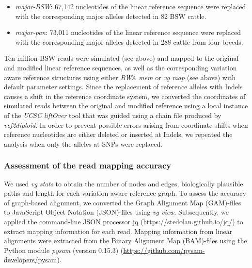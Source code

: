 \documentclass[../main.tex]{subfiles}
\begin{document}
\begin{itemize}
    \item \emph{major-BSW}: 67,142 nucleotides of the linear reference sequence were replaced with the corresponding major alleles detected in 82 BSW cattle.
    \item \emph{major-pan}: 73,011 nucleotides of the linear reference sequence were replaced with the corresponding major alleles detected in 288 cattle from four breeds.
\end{itemize}

Ten million BSW reads were simulated (see above) and mapped to the original and modified linear reference sequences, as well as the corresponding variation aware reference structures using either \emph{BWA mem} or \emph{vg map} (see above) with default parameter settings. Since the replacement of reference alleles with Indels causes a shift in the reference coordinate system, we converted the coordinates of simulated reads between the original and modified reference using a local instance of the \emph{UCSC liftOver} tool \citep{haeussler2019ucsc} that was guided using a chain file produced by \emph{vcf2diploid}. In order to prevent possible errors arising from coordinate shifts when reference nucleotides are either deleted or inserted at Indels, we repeated the analysis when only the alleles at SNPs were replaced.

\subsubsection*{Assessment of the read mapping accuracy}

We used \emph{vg stats} to obtain the number of nodes and edges, biologically plausible paths and length for each variation-aware reference graph. To assess the accuracy of graph-based alignment, we converted the Graph Alignment Map (GAM)-files to JavaScript Object Notation (JSON)-files using \emph{vg view}. Subsequently, we applied the command-line JSON processor jq (\url{https://stedolan.github.io/jq/}) to extract mapping information for each read. Mapping information from linear alignments were extracted from the Binary Alignment Map (BAM)-files using the Python module \emph{pysam} (version 0.15.3) (\url{https://github.com/pysam-developers/pysam}).
\end{document}
